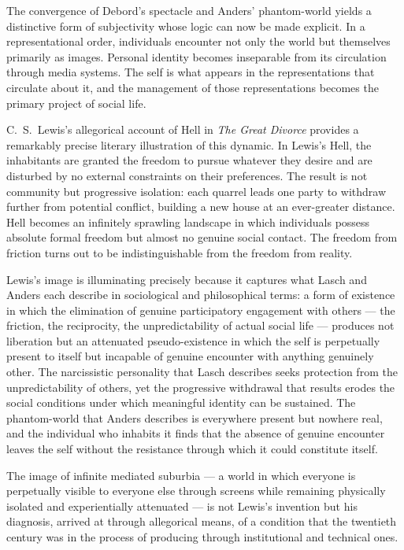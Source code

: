 \documentclass[12pt]{memoir}
\begin{document}
The convergence of Debord's spectacle and Anders' phantom-world yields a distinctive
form of subjectivity whose logic can now be made explicit. In a representational
order, individuals encounter not only the world but themselves primarily as images.
Personal identity becomes inseparable from its circulation through media systems.
The self is what appears in the representations that circulate about it, and the
management of those representations becomes the primary project of social life.

C.~S.~Lewis's allegorical account of Hell in \textit{The Great Divorce} provides
a remarkably precise literary illustration of this dynamic. In Lewis's Hell, the
inhabitants are granted the freedom to pursue whatever they desire and are disturbed
by no external constraints on their preferences. The result is not community but
progressive isolation: each quarrel leads one party to withdraw further from
potential conflict, building a new house at an ever-greater distance. Hell becomes
an infinitely sprawling landscape in which individuals possess absolute formal
freedom but almost no genuine social contact. The freedom from friction turns out to
be indistinguishable from the freedom from reality.

Lewis's image is illuminating precisely because it captures what Lasch and Anders
each describe in sociological and philosophical terms: a form of existence in which
the elimination of genuine participatory engagement with others — the friction, the
reciprocity, the unpredictability of actual social life — produces not liberation but
an attenuated pseudo-existence in which the self is perpetually present to itself
but incapable of genuine encounter with anything genuinely other. The narcissistic
personality that Lasch describes seeks protection from the unpredictability of others,
yet the progressive withdrawal that results erodes the social conditions under which
meaningful identity can be sustained. The phantom-world that Anders describes is
everywhere present but nowhere real, and the individual who inhabits it finds that
the absence of genuine encounter leaves the self without the resistance through which
it could constitute itself.

The image of infinite mediated suburbia — a world in which everyone is perpetually
visible to everyone else through screens while remaining physically isolated and
experientially attenuated — is not Lewis's invention but his diagnosis, arrived at
through allegorical means, of a condition that the twentieth century was in the
process of producing through institutional and technical ones.
\end{document}
